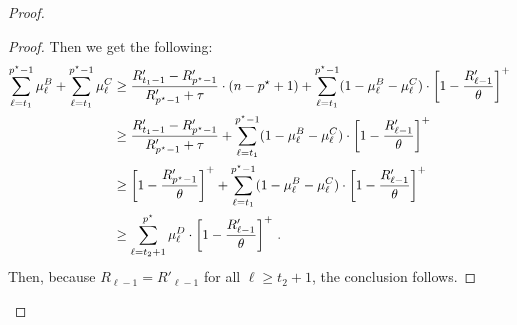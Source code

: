 \begin{proof}
\begin{proof}
        Then we get the following:
        \begin{align*}
            \sum_{\ell=t_1}^{p^\star-1}\mu_\ell^B +\sum_{\ell=t_1}^{p^\star-1}\mu_\ell^C
            &\geq \frac{R'_{t_1 - 1}-R'_{p^\star-1}}{R'_{p^\star-1}+\tau} \cdot (n-p^\star+1) + \sum_{\ell=t_1}^{p^\star-1} (1-\mu_{\ell}^B-\mu_{\ell}^C)\cdot\left[1-\frac{R'_{\ell-1}}{\theta}\right]^+\\
            &\geq \frac{R'_{t_1 - 1}-R'_{p^\star-1}}{R'_{p^\star-1}+\tau} + \sum_{\ell=t_1}^{p^\star-1} (1-\mu_{\ell}^B-\mu_{\ell}^C)\cdot\left[1-\frac{R'_{\ell-1}}{\theta}\right]^+\\
            &\geq \left[1-\frac{R'_{p^\star-1}}{\theta}\right]^+ + \sum_{\ell=t_1}^{p^\star-1} (1-\mu_{\ell}^B-\mu_{\ell}^C)\cdot\left[1-\frac{R'_{\ell-1}}{\theta}\right]^+\\
            &\geq \sum_{\ell=t_2+1}^{p^\star} \mu_{\ell}^D \cdot\left[1-\frac{R'_{\ell-1}}{\theta}\right]^+\,.
        \end{align*}
        Then, because $R_{\ell - 1} = R'_{\ell - 1}$ for all $\ell \geq t_2 + 1$, the conclusion follows.
    \end{proof}
    

\end{proof}

